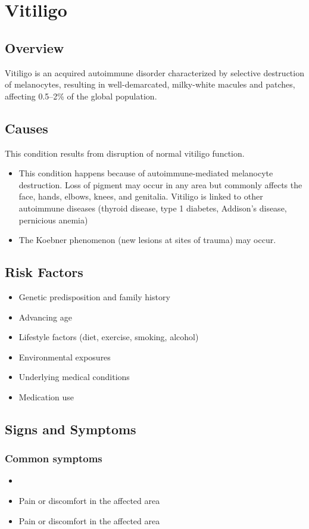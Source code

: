 \chapter{Vitiligo}
\label{sec:Vitiligo}

\section{Overview}
Vitiligo is an acquired autoimmune disorder characterized by selective destruction of melanocytes, resulting in well-demarcated, milky-white macules and patches, affecting 0.5--2\% of the global population.
\section{Causes}
This condition results from disruption of normal vitiligo function.

\begin{itemize}[noitemsep]
  \item This condition happens because of autoimmune-mediated melanocyte destruction. Loss of pigment may occur in any area but commonly affects the face, hands, elbows, knees, and genitalia. Vitiligo is linked to other autoimmune diseases (thyroid disease, type 1 diabetes, Addison's disease, pernicious anemia)
  \item The Koebner phenomenon (new lesions at sites of trauma) may occur.
\end{itemize}
\section{Risk Factors}


\begin{itemize}[noitemsep]
  \item Genetic predisposition and family history
  \item Advancing age
  \item Lifestyle factors (diet, exercise, smoking, alcohol)
  \item Environmental exposures
  \item Underlying medical conditions
  \item Medication use
\end{itemize}
\section{Signs and Symptoms}

\subsection{Common symptoms}
\begin{itemize}[noitemsep]
  \item \item Pain or discomfort in the affected area    \item Pain or discomfort in the affected area
  \end{itemize}

